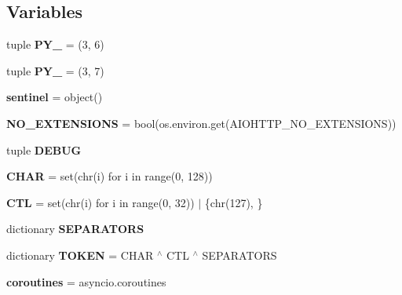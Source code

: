 \subsection*{Variables}
\begin{DoxyCompactItemize}
\item 
\mbox{\label{namespaceaiohttp_1_1helpers_a9d091b08133f17b12410a7a4b3f402e0}} 
tuple {\bfseries P\+Y\+\_} = (3, 6)
\item 
\mbox{\label{namespaceaiohttp_1_1helpers_abc18f43cfbd576a7f33e3509781f11d0}} 
tuple {\bfseries P\+Y\+\_} = (3, 7)
\item 
\mbox{\label{namespaceaiohttp_1_1helpers_a8ceaf0cec9a540e1b996ec39b3e92ba9}} 
{\bfseries sentinel} = object()
\item 
\mbox{\label{namespaceaiohttp_1_1helpers_aad41b68ba7084b8ba73e7dc54555f761}} 
{\bfseries N\+O\+\_\+\+E\+X\+T\+E\+N\+S\+I\+O\+NS} = bool(os.\+environ.\+get(\textquotesingle{}A\+I\+O\+H\+T\+T\+P\+\_\+\+N\+O\+\_\+\+E\+X\+T\+E\+N\+S\+I\+O\+NS\textquotesingle{}))
\item 
tuple {\bfseries D\+E\+B\+UG}
\item 
\mbox{\label{namespaceaiohttp_1_1helpers_a9fe30c90b6c60f1050eb646b6fc4e885}} 
{\bfseries C\+H\+AR} = set(chr(i) for i in range(0, 128))
\item 
\mbox{\label{namespaceaiohttp_1_1helpers_a51c5cae7a49d858bb6da0d29195b2024}} 
{\bfseries C\+TL} = set(chr(i) for i in range(0, 32)) $\vert$ \{chr(127), \}
\item 
dictionary {\bfseries S\+E\+P\+A\+R\+A\+T\+O\+RS}
\item 
\mbox{\label{namespaceaiohttp_1_1helpers_ae285198ab0596afdf98294e6b23a61f5}} 
dictionary {\bfseries T\+O\+K\+EN} = C\+H\+AR $^\wedge$ C\+TL $^\wedge$ S\+E\+P\+A\+R\+A\+T\+O\+RS
\item 
\mbox{\label{namespaceaiohttp_1_1helpers_a23b18b08079f8235309f1fa5a4ceb003}} 
{\bfseries coroutines} = asyncio.\+coroutines
\item 

\end{DoxyCompactItemize}
